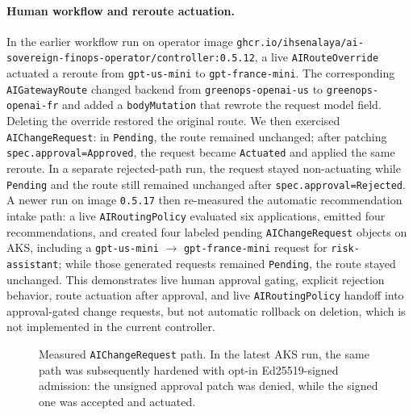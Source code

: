 \paragraph{Human workflow and reroute actuation.}
In the earlier workflow run on operator image \texttt{ghcr.io/ihsenalaya/ai-sovereign-finops-operator/controller:0.5.12}, a live \texttt{AIRouteOverride} actuated a reroute from \texttt{gpt-us-mini} to \texttt{gpt-france-mini}. The corresponding \texttt{AIGatewayRoute} changed backend from \texttt{greenops-openai-us} to \texttt{greenops-openai-fr} and added a \texttt{bodyMutation} that rewrote the request model field. Deleting the override restored the original route. We then exercised \texttt{AIChangeRequest}: in \texttt{Pending}, the route remained unchanged; after patching \texttt{spec.approval=Approved}, the request became \texttt{Actuated} and applied the same reroute. In a separate rejected-path run, the request stayed non-actuating while \texttt{Pending} and the route still remained unchanged after \texttt{spec.approval=Rejected}. A newer run on image \texttt{0.5.17} then re-measured the automatic recommendation intake path: a live \texttt{AIRoutingPolicy} evaluated six applications, emitted four recommendations, and created four labeled pending \texttt{AIChangeRequest} objects on AKS, including a \texttt{gpt-us-mini} $\rightarrow$ \texttt{gpt-france-mini} request for \texttt{risk-assistant}; while those generated requests remained \texttt{Pending}, the route stayed unchanged. This demonstrates live human approval gating, explicit rejection behavior, route actuation after approval, and live \texttt{AIRoutingPolicy} handoff into approval-gated change requests, but not automatic rollback on deletion, which is not implemented in the current controller.

\begin{figure}[t]
\centering
{}
\caption{Measured \texttt{AIChangeRequest} path. In the latest AKS run, the same path was subsequently hardened with opt-in Ed25519-signed admission: the unsigned approval patch was denied, while the signed one was accepted and actuated.}
\end{figure}

